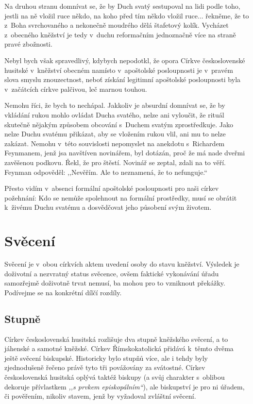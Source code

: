 Na druhou stranu domnívat se, že by Duch svatý sestupoval na lidi podle toho,
jestli na ně vložil ruce někdo, na koho před tím někdo vložil ruce... řekněme,
že to z~Boha svrchovaného a nekonečně moudrého dělá štafetový kolík. Vycházet
z~obecného kněžství je tedy v~duchu reformačním jednoznačně více na straně pravé
zbožnosti.

Nebyl bych však spravedlivý, kdybych nepodotkl, že opora Církve československé
husitské v~kněžství obecném namísto v~apoštolské posloupnosti je v~pravém slova
smyslu znouzectnost, neboť získání legitimní apoštolské posloupnosti
byla v~začátcích církve palčivou, leč marnou touhou.

Nemohu říci, že bych to nechápal. Jakkoliv je absurdní domnívat se, že by
vkládání rukou mohlo ovládat Ducha svatého, nelze ani vyloučit, že rituál
skutečně nějakým způsobem obcování s~Duchem svatým zprostředkuje. Jako nelze
Duchu svatému přikázat, aby se vložením rukou vlil, ani mu to nelze zakázat.
Nemohu v~této souvislosti nepomyslet na anekdotu s~Richardem Feynmanem, jenž jsa
navštíven novinářem, byl dotázán, proč že má nade dveřmi zavěšenou podkovu.
Řekl, že pro štěstí. Novinář se zeptal, zdali na to věří. Feynman odpověděl:
,,Nevěřím. Ale to neznamená, že to nefunguje.``

Přesto vidím v~absenci formální apoštolské posloupnosti pro naši církev
požehnání: Kdo se nemůže spolehnout na formální prostředky, musí se obrátit
k~živému Duchu svatému a dosvědčovat jeho působení svým životem.

\chapter{Svěcení}

Svěcení je v~obou církvích aktem uvedení osoby do stavu kněžství. Výsledek je
doživotní a nezvratný status svěcence, ovšem faktické vykonávání úřadu
samozřejmě doživotně trvat nemusí, ba mohou pro to vzniknout překážky.
Podívejme se na konkrétní dílčí rozdíly.

\section{Stupně}

Církev československá husitská rozlišuje dva stupně kněžského svěcení,
a to jáhenské a samotné kněžské. Církev Římskokatolická přidává k~těmto dvěma
ještě svěcení biskupské. Historicky bylo stupňů více, ale i tehdy byly
zjednodušeně řečeno právě tyto tři povážovány za svátostné. Církev
československá husitská oplývá taktéž biskupy (a svůj charakter s~oblibou
dekoruje přívlastkem \textit{,,s prvkem episkopálním``}), ale biskupství je pro
ni úřadem, či pověřením, nikoliv stavem, jenž by vyžadoval zvláštní svěcení.

